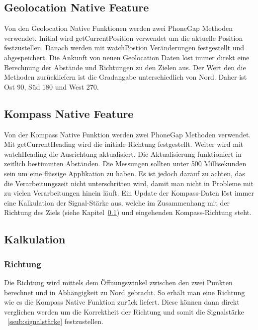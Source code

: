\subsection{Geolocation Native Feature} %
\label{sub:geolocation_native_feature}
Von den Geolocation Native Funktionen werden zwei PhoneGap Methoden verwendet. Initial wird getCurrentPosition verwendet um die aktuelle Position festzustellen. Danach werden mit watchPostion Veränderungen festgestellt und abgespeichert. Die Ankunft von neuen Geolocation Daten löst immer direkt eine Berechnung der Abstände und Richtungen zu den Zielen aus. Der Wert den die Methoden zurückliefern ist die Gradangabe unterschiedlich von Nord. Daher ist Ost 90, Süd 180 und West 270.

\subsection{Kompass Native Feature} %
\label{sub:kompass_native_feature}
Von der Kompass Native Funktion werden zwei PhoneGap Methoden verwendet. Mit getCurrentHeading wird die initiale Richtung festgestellt. Weiter wird mit watchHeading die Ausrichtung aktualisiert. Die Aktualisierung funktioniert in zeitlich bestimmten Abständen. Die Messungen sollten unter 500 Millisekunden sein um eine flüssige Applikation zu haben. Es ist jedoch darauf zu achten, das die Verarbeitungszeit nicht unterschritten wird, damit man nicht in Probleme mit zu vielen Verarbeitungen hinein läuft. Ein Update der Kompass-Daten löst immer eine Kalkulation der Signal-Stärke aus, welche im Zusammenhang mit der Richtung des Ziels (siehe Kapitel~\ref{sub:geolocation_native_feature}) und eingehenden Kompass-Richtung steht.

\subsection{Kalkulation} %
\label{sub:kalkulation}
\subsubsection{Richtung} %
\label{ssub:richtung}
Die Richtung wird mittels dem Öffnungswinkel zwischen den zwei Punkten berechnet und in Abhängigkeit zu Nord gebracht. So erhält man eine Richtung wie es die Kompass Native Funktion zurück liefert. Diese können dann direkt verglichen werden um die Korrektheit der Richtung und somit die Signalstärke ~\ref{ssub:signalstärke}
 festzustellen. 
